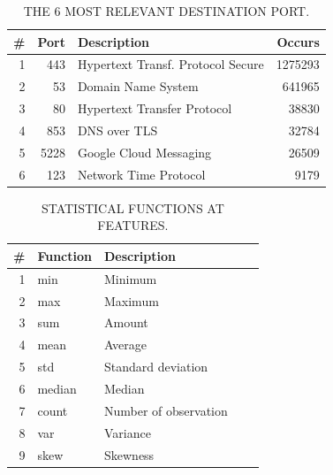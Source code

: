 \begin{table}[h]
  \caption{THE 6 MOST RELEVANT DESTINATION PORT.}
  \centering
  \begin{small}
    \begin{tabular}{rrlr}   \hline
 \# & Port & Description & Occurs  \\ \hline

1 &  443 &  Hypertext Transf. Protocol Secure &  1275293  \\ 
  2 &  53 & Domain Name System & 641965  \\ 
  3 &  80 & Hypertext Transfer Protocol &  38830  \\ 
  4 &  853 & DNS over TLS &  32784  \\ 
  5 &  5228 & Google Cloud Messaging &  26509  \\ 
  6 &  123 & Network Time Protocol & 9179  \\ 
  
   \hline

 \end{tabular}
 \end{small}
 \label{tab:port}
 \end{table}


\begin{table}[ht]
  \caption{STATISTICAL FUNCTIONS AT FEATURES.}
  \centering
  \begin{small}
    \begin{tabular}{rllrr}   \hline
 \# & Function & Description\\ \hline

1 &  min &  Minimum\\ 
  2 &  max & Maximum\\ 
  3 &  sum & Amount\\ 
  4 &  mean & Average\\ 
  5 &  std & Standard deviation \\ 
  6 &  median & Median\\ 
  7 &  count & Number of observation\\ 
  8 &  var & Variance\\ 
  9 &  skew & Skewness \\ 
   \hline

 \end{tabular}
 \end{small}
 \label{tab:function}
 \end{table}

